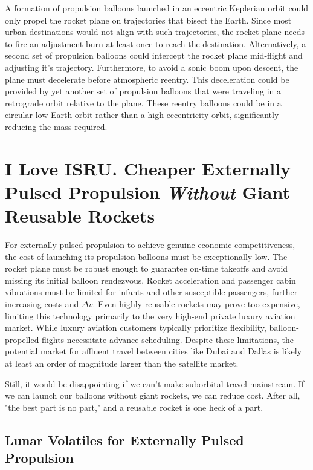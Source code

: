 \documentclass{article}
\begin{document}
{A formation of propulsion balloons launched in an eccentric Keplerian orbit could only propel the  rocket plane on trajectories that bisect the Earth. Since most urban destinations would not align with such trajectories, the rocket plane needs to fire an adjustment burn at least once to reach the destination. Alternatively, a second set of propulsion balloons could intercept the rocket plane mid-flight and adjusting it's trajectory. Furthermore, to avoid a sonic boom upon descent, the plane must decelerate before atmospheric reentry. This deceleration could be provided by yet another set of propulsion balloons that were traveling in a retrograde orbit relative to the plane. These reentry balloons could be in a circular low Earth orbit rather than a high eccentricity orbit, significantly reducing the mass required.

\section{I Love ISRU.  Cheaper Externally Pulsed Propulsion \textit{Without} Giant Reusable Rockets}
For externally pulsed propulsion to achieve genuine economic competitiveness, the cost of launching its propulsion balloons must be exceptionally low.  The rocket plane must be robust enough to guarantee on-time takeoffs and avoid missing its initial balloon rendezvous.  Rocket acceleration and passenger cabin vibrations must be limited for infants and other susceptible passengers, further increasing costs and $\Delta v$.  Even highly reusable rockets may prove too expensive, limiting this technology primarily to the very high-end private luxury aviation market. While luxury aviation customers typically prioritize flexibility, balloon-propelled flights necessitate advance scheduling.  Despite these limitations, the potential market for affluent travel between cities like Dubai and Dallas is likely at least an order of magnitude larger than the satellite market.

Still, it would be disappointing if we can't make suborbital travel mainstream.   If we can launch our balloons without giant rockets, we can reduce cost.   After all, "the best part is no part," \cite{best_part_no_part} and a reusable rocket is one heck of a part.

\subsection{Lunar Volatiles for Externally Pulsed Propulsion}

}
\end{document}
